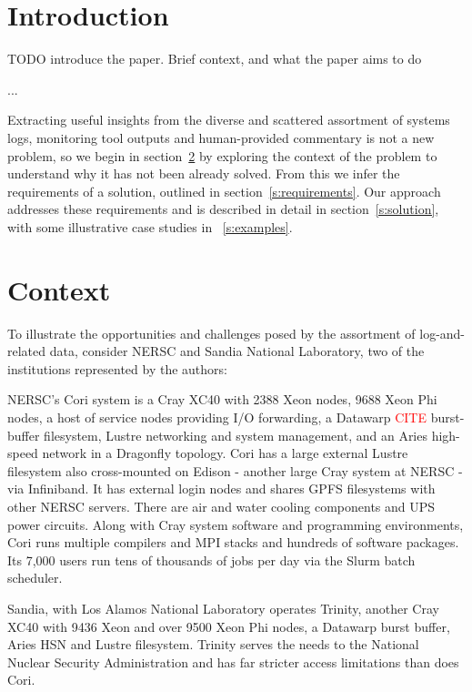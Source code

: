 \section{Introduction}
\label{s:intro}

TODO introduce the paper. Brief context, and what the paper aims to do

...

Extracting useful insights from the diverse and scattered assortment of systems 
logs, monitoring tool outputs and human-provided commentary is not a new 
problem, so we begin in section~\ref{s:context} by exploring the context of the
problem to understand why it has not been already solved. From this we infer 
the requirements of a solution, outlined in section~\ref{s:requirements}. Our 
approach addresses these requirements and is described in detail in 
section~\ref{s:solution}, with some illustrative case studies in 
~\ref{s:examples}.


\section{Context}
\label{s:context}

To illustrate the opportunities and challenges posed by the assortment of 
log-and-related data, consider NERSC and Sandia National Laboratory, two of the 
institutions represented by the authors:

NERSC's Cori system is a Cray XC40 with 2388 Xeon nodes, 9688 Xeon Phi nodes, 
a host of service nodes providing I/O forwarding, a Datawarp \textcolor{red}{CITE}
burst-buffer filesystem, Lustre networking and
system management, and an Aries high-speed network in a Dragonfly topology. Cori
has a large external Lustre filesystem also cross-mounted on Edison - another 
large Cray system at NERSC - via Infiniband. It has external login nodes and 
shares GPFS filesystems with other NERSC servers. There are air and water cooling
components and UPS power circuits. Along with Cray system software and 
programming environments, Cori runs multiple compilers and MPI stacks and
hundreds of software packages. Its 7,000 users run tens of thousands of jobs per 
day via the Slurm batch scheduler.

Sandia, with Los Alamos National Laboratory operates Trinity, another Cray XC40
with 9436 Xeon and over 9500 Xeon Phi nodes, a Datawarp burst buffer, Aries HSN
and Lustre filesystem. Trinity serves the needs to the National Nuclear 
Security Administration and has far stricter access limitations than does Cori.

